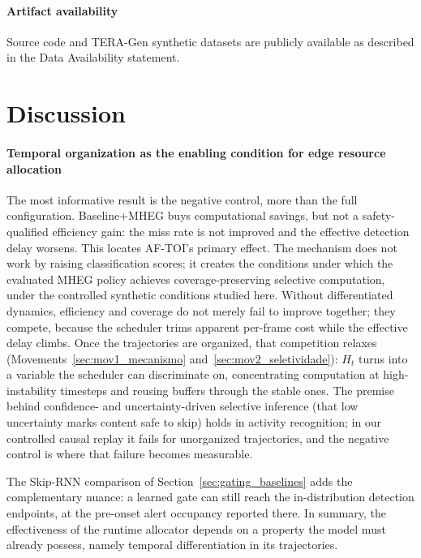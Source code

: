 \documentclass[a4paper,fleqn]{cas-dc}
\newcommand{\TERAGen}{\mbox{TERA-Gen}\xspace}
\newcommand{\AFTOI}{\mbox{AF-TOI}\xspace}
\newcommand{\MHEG}{\mbox{MHEG}\xspace}
\begin{document}
\paragraph{Artifact availability}
Source code and \TERAGen synthetic datasets are publicly available as
described in the Data Availability statement.
\section{Discussion}
\label{sec:discussao}
\paragraph{Temporal organization as the enabling condition for edge resource allocation}
The most informative result is the negative control, more than the full
configuration. {\color{\revcolor}Baseline+MHEG buys computational
savings, but not a safety-qualified efficiency gain: the miss rate is not
improved and the effective detection delay worsens.} This locates \AFTOI's
primary effect. The mechanism does not work by raising classification scores;
{\color{\revcolor}it creates the conditions under which the evaluated \MHEG
policy achieves coverage-preserving selective computation, under the
controlled synthetic conditions studied here.} Without differentiated dynamics, efficiency and
coverage do not merely fail to improve together; they compete, because the
scheduler trims apparent per-frame cost while the effective delay climbs. Once the
trajectories are organized, that competition relaxes
(Movements~\ref{sec:mov1_mecanismo} and~\ref{sec:mov2_seletividade}): $H_t$ turns
into a variable the scheduler can discriminate on, concentrating computation at
high-instability timesteps and reusing buffers through the stable ones. {\color{\revcolor}The premise
behind confidence- and uncertainty-driven selective inference (that low
uncertainty marks content safe to skip) holds in activity recognition}; in our
controlled causal replay it fails for unorganized trajectories, and the
negative control is where that failure becomes measurable.

The Skip-RNN
comparison of Section~\ref{sec:gating_baselines} adds the complementary
nuance: a learned gate can still reach the in-distribution detection
endpoints, at the pre-onset alert occupancy reported there. In summary, the effectiveness of the runtime allocator depends on a property the model must already possess, namely temporal differentiation in its trajectories.
\end{document}
